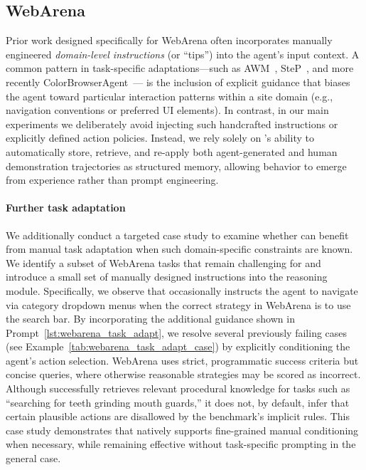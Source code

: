 \subsection{WebArena}
Prior work designed specifically for WebArena often incorporates manually engineered
\emph{domain-level instructions} (or ``tips'') into the agent’s input context.
A common pattern in task-specific adaptations—such as AWM~\cite{wang2024agentworkflowmemory},
SteP~\cite{sodhi2024stepstackedllmpolicies}, and more recently ColorBrowserAgent~\cite{zhou2026colorbrowseragentintelligentguiagent}—
is the inclusion of explicit guidance that biases the agent toward particular interaction
patterns within a site domain (e.g., navigation conventions or preferred UI elements).
In contrast, in our main experiments we deliberately avoid injecting such handcrafted
instructions or explicitly defined action policies.
Instead, we rely solely on \plugmem’s ability to automatically store, retrieve, and
re-apply both agent-generated and human demonstration trajectories as structured memory,
allowing behavior to emerge from experience rather than prompt engineering.

\paragraph{Further task adaptation}
We additionally conduct a targeted case study to examine whether \plugmem can benefit
from manual task adaptation when such domain-specific constraints are known.
We identify a subset of WebArena tasks that remain challenging for \plugmem and introduce
a small set of manually designed instructions into the reasoning module.
Specifically, we observe that \plugmem occasionally instructs the agent to navigate via
category dropdown menus when the correct strategy in WebArena is to use the search bar.
By incorporating the additional guidance shown in
Prompt~\ref{lst:webarena_task_adapt}, we resolve several previously failing cases
(see Example~\ref{tab:webarena_task_adapt_case}) by explicitly conditioning the agent’s
action selection. WebArena uses strict, programmatic success criteria but concise queries, where
otherwise reasonable strategies may be scored as incorrect.
Although \plugmem successfully retrieves relevant procedural knowledge for tasks such as
``searching for teeth grinding mouth guards,'' it does not, by default, infer that certain
plausible actions are disallowed by the benchmark’s implicit rules.
This case study demonstrates that \plugmem natively supports fine-grained manual
conditioning when necessary, while remaining effective without task-specific prompting
in the general case.
 

 

